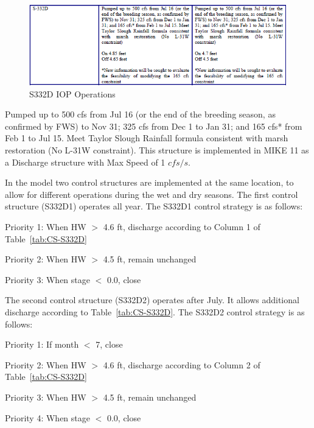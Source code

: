 \begin{figure}[!h]
  \begin{center}
  \includegraphics[width=6.5in]{../figs/S332D_IOPops.png}
  \caption{S332D IOP Operations}
  \label{fig:S332Diop}
  \end{center}
\end{figure}

Pumped up to 500 cfs from Jul 16 (or the end of the breeding season, as confirmed by FWS) to Nov 31; 325 cfs from Dec 1 to Jan 31; and 165 cfs* from Feb 1 to Jul 15. Meet Taylor Slough Rainfall formula consistent with marsh restoration (No L-31W constraint). This structure is implemented in MIKE 11 as a Discharge structure with Max Speed of 1 $cfs/s$.


In the model two control structures are implemented at the same location, to allow for different operations during the wet and dry seasons. The first control structure (S332D1) operates all year.  The S332D1 control strategy is as follows:

\begin{packed_items}
\item Priority 1: When HW $>$ 4.6 ft, discharge according to Column 1 of Table~\ref{tab:CS-S332D}
\item Priority 2: When HW $>$ 4.5 ft, remain unchanged
\item Priority 3: When stage $<$ 0.0, close
\end{packed_items}

The second control structure (S332D2) operates after July. It allows additional discharge according to Table~\ref{tab:CS-S332D}. The S332D2 control strategy is as follows:
\begin{packed_items}
\item Priority 1: If month $<$ 7, close
\item Priority 2: When HW $>$ 4.6 ft, discharge according to Column 2 of Table~\ref{tab:CS-S332D}
\item Priority 3: When HW $>$ 4.5 ft, remain unchanged
\item Priority 4: When stage $<$ 0.0, close
\end{packed_items}

